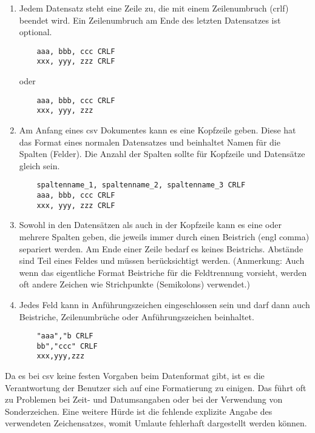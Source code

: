 \begin{enumerate}{}
	
	\item Jedem Datensatz steht eine Zeile zu, die mit einem Zeilenumbruch (\ac{crlf}) beendet wird. Ein Zeilenumbruch am Ende des letzten Datensatzes ist optional. \zB 
	\begin{lstlisting}
	aaa, bbb, ccc CRLF
	xxx, yyy, zzz CRLF
	\end{lstlisting}
	oder
	\begin{lstlisting}
	aaa, bbb, ccc CRLF
	xxx, yyy, zzz
	\end{lstlisting}
	
	\item Am Anfang eines \acs{csv} Dokumentes kann es eine Kopfzeile geben. Diese hat das Format eines normalen Datensatzes und beinhaltet Namen für die Spalten (Felder). Die Anzahl der Spalten sollte für Kopfzeile und Datensätze gleich sein. \zB
	\begin{lstlisting}
	spaltenname_1, spaltenname_2, spaltenname_3 CRLF
	aaa, bbb, ccc CRLF
	xxx, yyy, zzz CRLF
	\end{lstlisting}
	
	\item Sowohl in den Datensätzen als auch in der Kopfzeile kann es eine oder mehrere Spalten geben, die jeweils immer durch einen Beistrich (\acs{engl} comma) separiert werden. Am Ende einer Zeile bedarf es keines Beistrichs. Abstände sind Teil eines Feldes und müssen berücksichtigt werden. (Anmerkung: Auch wenn das eigentliche Format Beistriche für die Feldtrennung vorsieht, werden oft andere Zeichen wie \zB Strichpunkte (Semikolons) verwendet.)
	
	\item Jedes Feld kann in Anführungszeichen eingeschlossen sein und darf dann auch Beistriche, Zeilenumbrüche oder Anführungszeichen beinhaltet. \zB
	\begin{lstlisting}
	"aaa","b CRLF
	bb","ccc" CRLF
	xxx,yyy,zzz
	\end{lstlisting}
	
\end{enumerate}

Da es bei \acs{csv} keine festen Vorgaben beim Datenformat gibt, ist es die Verantwortung der Benutzer sich auf eine Formatierung zu einigen. Das führt oft zu Problemen bei Zeit- und Datumsangaben oder bei der Verwendung von Sonderzeichen. Eine weitere Hürde ist die fehlende explizite Angabe des verwendeten Zeichensatzes, womit \zB Umlaute fehlerhaft dargestellt werden können. \cite{FuchsMediaSolutions:o.J.}

